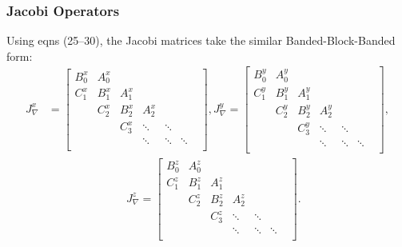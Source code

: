 \documentclass[10pt]{beamer}
\begin{document}
\frame
{
    \frametitle{Jacobi Operators}
    
Using eqns (25--30), the Jacobi matrices take the similar Banded-Block-Banded form:
\begin{align}
J_\nabla^x &= \begin{bmatrix}
		B^x_0 & A^x_0 & & & & \\
		C^x_1 & B^x_1 & A^x_1 & & & \\
		& C^x_2 & B^x_2 & A^x_2  & & & \\
		& & C^x_3 & \ddots & \ddots & \\
		& & & \ddots & \ddots & \ddots \\
	\end{bmatrix},
J_\nabla^y = \begin{bmatrix}
		B^y_0 & A^y_0 & & & & \\
		C^y_1 & B^y_1 & A^y_1 & & & \\
		& C^y_2 & B^y_2 & A^y_2  & & & \\
		& & C^y_3 & \ddots & \ddots & \\
		& & & \ddots & \ddots & \ddots \\
	\end{bmatrix}, \nonumber \\
&\quad \quad \quad \quad \quad \quad \quad J_\nabla^z = \begin{bmatrix}
		B^z_0 & A^z_0 & & & & \\
		C^z_1 & B^z_1 & A^z_1 & & & \\
		& C^z_2 & B^z_2 & A^z_2  & & & \\
		& & C^z_3 & \ddots & \ddots & \\
		& & & \ddots & \ddots & \ddots \\
	\end{bmatrix}.
\end{align}

}
\end{document}
